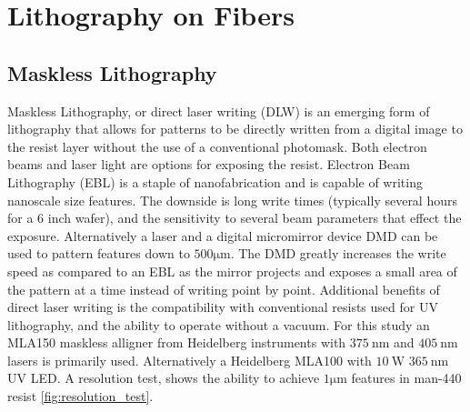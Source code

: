 


\section{Lithography on Fibers}
\subsection{Maskless Lithography}
Maskless Lithography, or direct laser writing (DLW) is an emerging form of lithography that allows for patterns to be directly written from a digital image to the resist layer without the use of a conventional photomask. Both electron beams and laser light are options for exposing the resist. Electron Beam Lithography (EBL) is a staple of nanofabrication and is capable of writing nanoscale size features. The downside is long write times (typically several hours for a $6$ inch wafer), and the sensitivity to several beam parameters that effect the exposure. Alternatively a laser and a digital micromirror device DMD can be used to pattern features down to $500 \si{\micro\meter}$. The DMD greatly increases the write speed as compared to an EBL as the mirror projects and exposes a small area of the pattern at a time instead of writing point by point. Additional benefits of direct laser writing is the compatibility with conventional resists used for UV lithography, and the ability to operate without a vacuum. For this study an MLA150 maskless alligner from Heidelberg instruments with $\SI{375}{\nm}$ and $\SI{405}{\nm}$lasers is primarily used. Alternatively a Heidelberg MLA100 with $\SI{10}{\watt}$ $\SI{365}{\nm}$ UV LED. A resolution test, shows the ability to achieve $ 1 \si{\micro \meter}$ features in man-440 resist \ref{fig:resolution_test}. 

